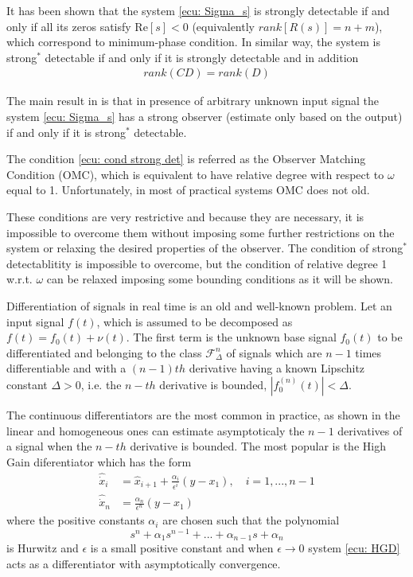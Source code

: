 \documentclass[11pt,letterpaper,twoside,openright]{report}
\begin{document}
It has been shown that the system \eqref{ecu: Sigma_s} is strongly detectable if and only if all its zeros satisfy Re$[s]<0$ (equivalently $rank[R(s)]=n+m$), which correspond to minimum-phase condition. In similar way, the system is strong$^*$ detectable if and only if it is strongly detectable and in addition 
	\begin{equation}\label{ecu: cond strong det}
\begin{split}
rank(CD) = rank(D)
\end{split}
	\end{equation} 
	
The main result in \cite{Hautus1983} is that in presence of arbitrary unknown input signal the system \eqref{ecu: Sigma_s} has a strong observer (estimate only based on the output) if and only if it is strong$^*$ detectable.

The condition \eqref{ecu: cond strong det} is referred as the Observer Matching Condition (OMC), which is equivalent to have relative degree with respect to $\omega$ equal to 1. Unfortunately, in most of practical systems OMC does not old.

These conditions are very restrictive and because they are necessary, it is impossible to overcome them without imposing some further restrictions on the system or relaxing the desired properties of the observer. The condition of strong$^*$ detectablitity is impossible to overcome, but the condition of relative degree 1 w.r.t. $\omega$ can be relaxed imposing some bounding conditions as it will be shown.

Differentiation of signals in real time is an old and well-known problem. Let an input signal $f(t)$, which is assumed to be decomposed as $f(t)=f_0(t)+\nu(t)$. The first term is the unknown base signal $f_0(t)$ to be differentiated and belonging to the class $\mathscr{F}^{n}_{\Delta}$ of signals which are $n-1$ times differentiable and with a $(n-1)th$ derivative  having a known Lipschitz constant $\Delta>0$, i.e. the $n-th$ derivative is bounded, $|f_0^{(n)}(t)|<\Delta$.

The continuous differentiators are the most common in practice, as shown in \cite{Khalil2003}\cite{Khalil2014}\cite{Khalil2017} the linear and homogeneous ones can estimate asymptoticaly the $n-1$ derivatives of a signal when the $n-th$ derivative is bounded. The most popular is the High Gain diferentiator which has the form
\begin{equation}\label{ecu: HGD}
\begin{split}
\hat{\dot{x}}_i &= \hat{x}_{i+1}+\frac{\alpha_i}{\epsilon^i}(y-x_1), \quad i=1,...,n-1 \\
\hat{\dot{x}}_n &= \frac{\alpha_n}{\epsilon^n}(y-x_1)
\end{split}
\end{equation}
where the positive constants $\alpha_i$ are chosen such that the polynomial 
\begin{equation}
s^n+\alpha_1s^{n-1}+...+\alpha_{n-1}s+\alpha_n
\end{equation}
is Hurwitz and $\epsilon$ is a small positive constant and when $\epsilon\rightarrow 0$ system \eqref{ecu: HGD} acts as a differentiator with asymptotically convergence. 
\end{document}
